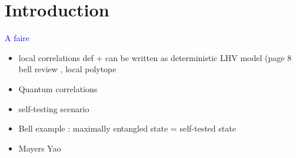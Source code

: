 \section{Introduction}\label{introduction}


\textcolor{blue}{A faire}

\begin{itemize}

    
    \item local correlations def + can be written as deterministic LHV model (page 8 bell review , local polytope
    \item Quantum correlations
    \item self-testing scenario
    \item Bell example : maximally entangled state = self-tested state
    \item Mayers Yao
    
\end{itemize}

